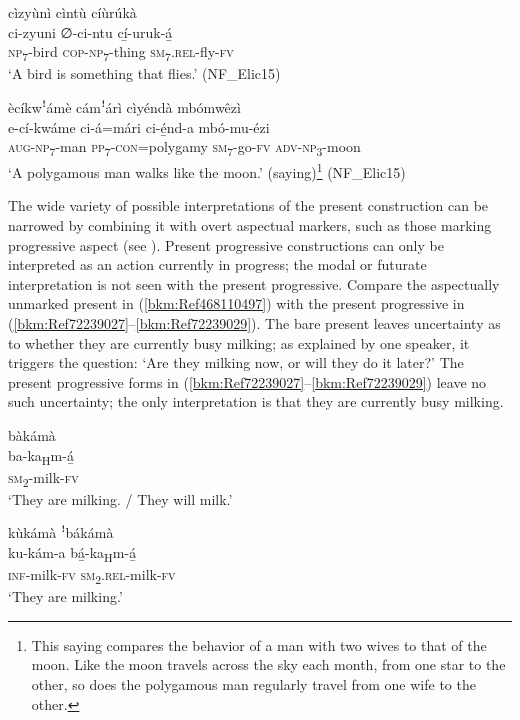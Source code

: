 \ea
\label{bkm:Ref477191361}
cìzyùnì cìntù cíùrúkà\\
\gll ci-zyuni  ∅-ci-ntu    cí̲-uruk-á̲\\
\textsc{np}\textsubscript{7}-bird  \textsc{cop}-\textsc{np}\-\textsubscript{7}-thing  \textsc{sm}\textsubscript{7}.\textsc{rel}-fly-\textsc{fv}\\
\glt ‘A bird is something that flies.’ (NF\_Elic15)
\z

\ea
\label{bkm:Ref477191362}
ècíkwꜝámè cámꜝárì cìyéndà mbómwêzì\\
\gll e-cí-kwáme    ci-á=mári    ci-é̲nd-a  mbó-mu-ézi\\
\textsc{aug}-\textsc{np}\textsubscript{7}-man  \textsc{pp}\textsubscript{7}-\textsc{con}=polygamy  \textsc{sm}\textsubscript{7}-go-\textsc{fv}  \textsc{adv}-\textsc{np}\textsubscript{3}-moon\\
\glt ‘A polygamous man walks like the moon.’ (saying)\footnote{This saying compares the behavior of a man with two wives to that of the moon. Like the moon travels across the sky each month, from one star to the other, so does the polygamous man regularly travel from one wife to the other.} (NF\_Elic15)
\z

The wide variety of possible interpretations of the present construction can be narrowed by combining it with overt aspectual markers, such as those marking progressive aspect (see ). Present progressive constructions can only be interpreted as an action currently in progress; the modal or futurate interpretation is not seen with the present progressive. Compare the aspectually unmarked present in (\ref{bkm:Ref468110497}) with the present progressive in (\ref{bkm:Ref72239027}--\ref{bkm:Ref72239029}). The bare present leaves uncertainty as to whether they are currently busy milking; as explained by one speaker, it triggers the question: ‘Are they milking now, or will they do it later?’ The present progressive forms in (\ref{bkm:Ref72239027}--\ref{bkm:Ref72239029}) leave no such uncertainty; the only interpretation is that they are currently busy milking.

\ea
\label{bkm:Ref468110497}
\glll bàkámà\\
ba-ka\textsubscript{H}m-á̲\\
\textsc{sm}\textsubscript{2}-milk-\textsc{fv}\\
\glt ‘They are milking. / They will milk.’
\z

\ea
\label{bkm:Ref72239027}
kùkámà ꜝbákámà\\
\gll ku-kám-a  bá̲-ka\textsubscript{H}m-á̲\\
\textsc{inf}-milk-\textsc{fv}  \textsc{sm}\textsubscript{2}.\textsc{rel}-milk-\textsc{fv}\\
\glt ‘They are milking.’
\z


